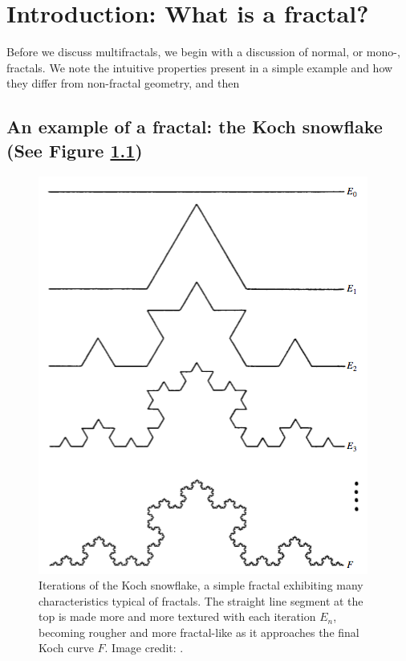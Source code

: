 
\chapter{Introduction: What is a fractal?} %

\label{Chapter1} %



Before we discuss multifractals, we begin with a discussion of normal, or mono-, fractals. We note the intuitive properties present in a simple example and how they differ from non-fractal geometry, and then 

\section{An example of a fractal: the Koch snowflake (See Figure \ref{fig:kochcurve})}\label{fractalexample}
\begin{figure}
\centering
\includegraphics[scale=0.5]{Chapters/Figures/Kochcurve.png} 
\caption[Koch Curve]{Iterations of the Koch snowflake, a simple fractal exhibiting many characteristics typical of fractals. The straight line segment at the top is made more and more textured with each iteration $E_{n}$, becoming rougher and more fractal-like as it approaches the final Koch curve $F$. Image credit: \citep{fractaltextbook}. }\label{fig:kochcurve}
\end{figure}

